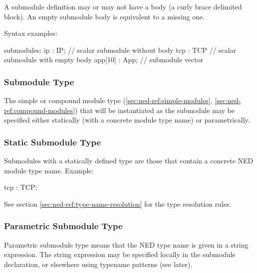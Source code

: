 A submodule definition may or may not have a body (a curly brace
delimited block). An empty submodule body is equivalent to a
missing one.

Syntax examples:
\begin{ned}
submodules:
    ip : IP;         // scalar submodule without body
    tcp : TCP {}     // scalar submodule with empty body
    app[10] : App;   // submodule vector
\end{ned}


\subsubsection{Submodule Type}
\label{sec:ned-ref:submodule-type}

The simple or compound module type (\ref{sec:ned-ref:simple-modules},
\ref{sec:ned-ref:compound-modules}) that will be instantiated as the
submodule may be specified either statically (with a concrete module type
name) or parametrically.


\subsubsection{Static Submodule Type}
\label{sec:ned-ref:static-submodule-type}

Submodules with a statically defined type are those that contain a concrete
NED module type name. Example:

\begin{ned}
tcp : TCP;
\end{ned}

See section \ref{sec:ned-ref:type-name-resolution} for the type resolution
rules.


\subsubsection{Parametric Submodule Type}
\label{sec:ned-ref:parametric-submodule-type}

Parametric submodule type means that the NED type name is given in a string
expression. The string expression may be specified locally in the submodule
declaration, or elsewhere using typename patterns (see later).


